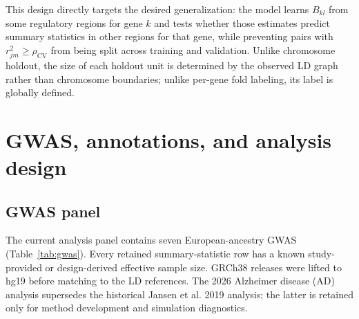 \documentclass[11pt]{article}
\begin{document}
This design directly targets the desired generalization: the model learns $B_{kl}$ from some regulatory regions for gene $k$ and tests whether those estimates predict summary statistics in other regions for that gene, while preventing pairs with $r_{jm}^2\ge\rho_{\mathrm{CV}}$ from being split across training and validation. Unlike chromosome holdout, the size of each holdout unit is determined by the observed LD graph rather than chromosome boundaries; unlike per-gene fold labeling, its label is globally defined.

\section{GWAS, annotations, and analysis design}

\subsection{GWAS panel}

The current analysis panel contains seven European-ancestry GWAS (Table~\ref{tab:gwas}). Every retained summary-statistic row has a known study-provided or design-derived effective sample size. GRCh38 releases were lifted to hg19 before matching to the LD references. The 2026 Alzheimer disease (AD) analysis supersedes the historical Jansen et al. 2019 analysis; the latter is retained only for method development and simulation diagnostics.

\begin{table}[ht]
\centering
\small
\caption{GWAS used in the current cross-trait analyses.}
\label{tab:gwas}
\end{table}
\end{document}
